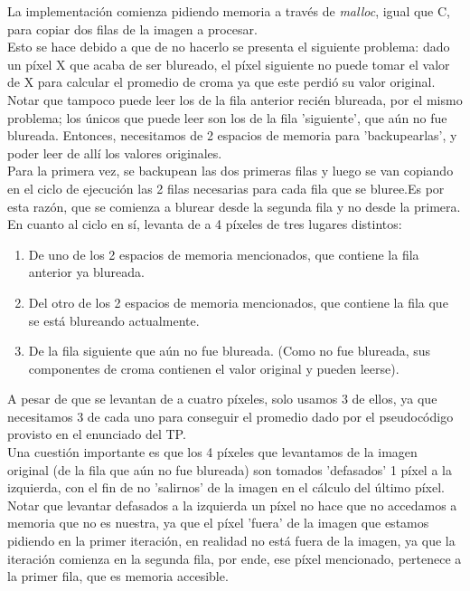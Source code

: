 La implementación comienza pidiendo memoria a través de \textit{malloc}, igual que C, para copiar dos filas de la imagen a procesar.\\
Esto se hace debido a que de no hacerlo se presenta el siguiente problema: dado un píxel X que acaba de ser blureado, el píxel siguiente no puede tomar el valor de X para calcular el promedio de croma ya que este perdió su valor original. Notar que tampoco puede leer los de la fila anterior recién blureada, por el mismo problema; los únicos que puede leer son los de la fila 'siguiente', que aún no fue blureada. Entonces, necesitamos de 2 espacios de memoria para 'backupearlas', y poder leer de allí los valores originales.\\

Para la primera vez, se backupean las dos primeras filas y luego se van copiando en el ciclo de ejecución las 2 filas necesarias para cada fila que se bluree.Es por esta razón, que se comienza a blurear desde la segunda fila y no desde la primera.\\

En cuanto al ciclo en sí, levanta de a 4 píxeles de tres lugares distintos:
\begin{enumerate}
\item De uno de los 2 espacios de memoria mencionados, que contiene la fila anterior ya blureada.
\item Del otro de los 2 espacios de memoria mencionados, que contiene la fila que se está blureando actualmente.
\item De la fila siguiente que aún no fue blureada. (Como no fue blureada, sus componentes de croma contienen el valor original y pueden leerse). \\
\end{enumerate}
A pesar de que se levantan de a cuatro píxeles, solo usamos 3 de ellos, ya que necesitamos 3 de cada uno para conseguir el promedio dado por el pseudocódigo provisto en el enunciado del TP.\\

Una cuestión importante es que los 4 píxeles que levantamos de la imagen original (de la fila que aún no fue blureada) son tomados 'defasados' 1 píxel a la izquierda, con el fin de no 'salirnos' de la imagen en el cálculo del último píxel. Notar que levantar defasados a la izquierda un píxel no hace que no accedamos a memoria que no es nuestra, ya que el píxel 'fuera' de la imagen que estamos pidiendo en la primer iteración, en realidad no está fuera de la imagen, ya que la iteración comienza en la segunda fila, por ende, ese píxel mencionado, pertenece a la primer fila, que es memoria accesible.

